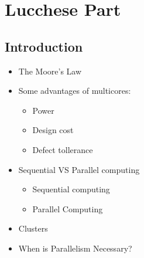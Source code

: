 \documentclass[12pt,oneside]{report}
\newcommand{\newblanckpage}{
    \newpage
    \thispagestyle{plain} %
    \mbox{}
}
\begin{document}

\restoregeometry



\tableofcontents

\clearpage


\setcounter{page}{1}



\part{Lucchese Part}
\chapter{Introduction}
\begin{itemize}
    \item The Moore's Law
    \item Some advantages of multicores:
    \begin{itemize}
        \item Power
        \item Design cost
        \item Defect tollerance
    \end{itemize}
    \item Sequential VS Parallel computing
    \begin{itemize}
        \item Sequential computing
        \item Parallel Computing
    \end{itemize}
    \item Clusters
    \item When is Parallelism Necessary?
\end{itemize}
\end{document}
